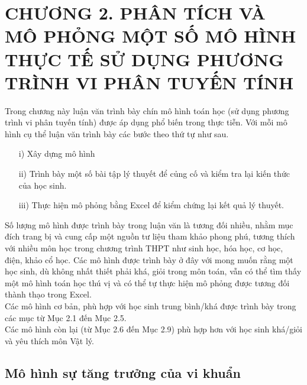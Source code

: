 \section*{CHƯƠNG 2. PHÂN TÍCH VÀ MÔ PHỎNG MỘT SỐ MÔ HÌNH  THỰC TẾ SỬ DỤNG PHƯƠNG TRÌNH VI PHÂN TUYẾN TÍNH}
\setcounter{section}{2}
\setcounter{subsection}{0}
\setcounter{figure}{0}
\setcounter{table}{2}
\setcounter{equation}{0}
Trong chương này luận văn trình bày chín mô hình toán học (sử dụng phương trình vi phân tuyến tính) được áp dụng phổ biến trong thực tiễn. Với mỗi mô hình cụ thể luận văn trình bày các bước theo thứ tự như sau.
\begin{itemize}
	\item[i)]	Xây dựng mô hình
	\item[ii)]	Trình bày một số bài tập lý thuyết để củng cố và kiểm tra lại kiến thức của học sinh.
	\item[iii)]	Thực hiện mô phỏng bằng Excel để kiểm chứng lại kết quả lý thuyết.  
\end{itemize}
Số lượng mô hình được trình bày trong luận văn là tương đối nhiều, nhằm mục đích trang bị và cung cấp một nguồn tư liệu tham khảo phong phú, tương thích với nhiều môn học trong chương trình THPT như sinh học, hóa học, cơ học, điện, khảo cổ học. Các mô hình được trình bày ở đây với mong muốn rằng một học sinh, dù không nhất thiết phải khá, giỏi trong môn toán, vẫn có thể tìm thấy một mô hình toán học thú vị và có thể tự thực hiện mô phỏng được tương đối thành thạo trong Excel. \\
Các mô hình cơ bản, phù hợp với học sinh trung bình/khá được trình bày trong các mục từ Mục 2.1 đến Mục 2.5.\\
Các mô hình còn lại (từ Mục 2.6 đến Mục 2.9) phù hợp hơn với học sinh khá/giỏi và yêu thích môn Vật lý.
\subsection{Mô hình sự tăng trưởng của vi khuẩn}
